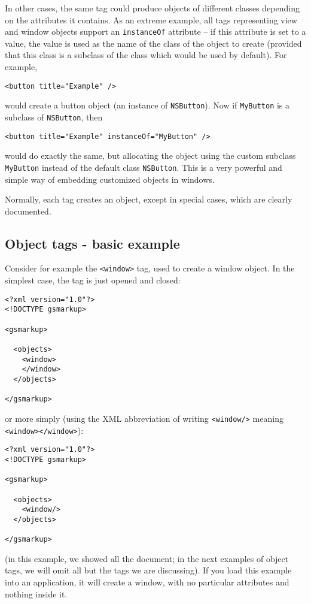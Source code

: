 In other cases, the same tag could produce objects of different
classes depending on the attributes it contains.  As an extreme
example, all tags representing view and window objects support an
\texttt{instanceOf} attribute -- if this attribute is set to a value, 
the value is used as the name of the class of the object to create
(provided that this class is a subclass of the class which would be
used by default).  For example,
\begin{verbatim}
<button title="Example" />
\end{verbatim}
would create a button object (an instance of \texttt{NSButton}).  Now
if \texttt{MyButton} is a subclass of \texttt{NSButton}, then
\begin{verbatim}
<button title="Example" instanceOf="MyButton" />
\end{verbatim}
would do exactly the same, but allocating the object using the custom
subclass \texttt{MyButton} instead of the default class
\texttt{NSButton}.  This is a very powerful and simple way of embedding 
customized objects in windows.

Normally, each tag creates an object, except in special cases, which
are clearly documented.

\subsection{Object tags - basic example}
Consider for example the \texttt{<window>} tag, used to create a
window object.  In the simplest case, the tag is just opened and
closed:
\begin{verbatim}
<?xml version="1.0"?>
<!DOCTYPE gsmarkup>

<gsmarkup>

  <objects>
    <window>
    </window>
  </objects>

</gsmarkup>
\end{verbatim}
or more simply (using the XML abbreviation of writing
\texttt{<window/>} meaning \texttt{<window></window>}):
\begin{verbatim}
<?xml version="1.0"?> 
<!DOCTYPE gsmarkup>

<gsmarkup>

  <objects>
    <window/>
  </objects>

</gsmarkup>
\end{verbatim}
(in this example, we showed all the document; in the next examples of
object tags, we will omit all but the tags we are discussing).  If you
load this example into an application, it will create a window, with
no particular attributes and nothing inside it.

